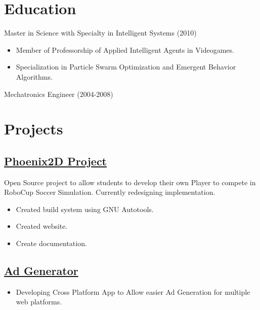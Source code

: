 \documentclass{scrartcl}
\begin{document}
\section*{Education}
Master in Science with Specialty in Intelligent Systems (2010)
\begin{itemize}[leftmargin=*]
	\setlength{\itemsep}{1pt}
  \setlength{\parskip}{0pt}
  \setlength{\parsep}{0pt}
	\item Member of Professorship of Applied Intelligent Agents in Videogames.
	\item Specialization in Particle Swarm Optimization and Emergent Behavior Algorithms.
\end{itemize}

\noindent
{}
Mechatronics Engineer (2004-2008) 

\section*{Projects}

\subsection*{\href{http://claudiordgz.github.io/Phoenix2D/}{Phoenix2D Project}}

Open Source project to allow students to develop their own Player to compete in RoboCup Soccer Simulation. Currently redesigning implementation.
\begin{itemize}[leftmargin=*]
	\setlength{\itemsep}{1pt}
  \setlength{\parskip}{0pt}
  \setlength{\parsep}{0pt}
	\item Created build system using GNU Autotools.
	\item Created website.
	\item Create documentation.
\end{itemize}

\subsection*{\href{https://github.com/claudiordgz/AdGenerator}{Ad Generator}}

\begin{itemize}[leftmargin=*]
	\setlength{\itemsep}{6pt}
  \setlength{\parskip}{0pt}
  \setlength{\parsep}{0pt}
  	\item Developing Cross Platform App to Allow easier Ad Generation for multiple web platforms. 
\end{itemize}

	
\end{document}
